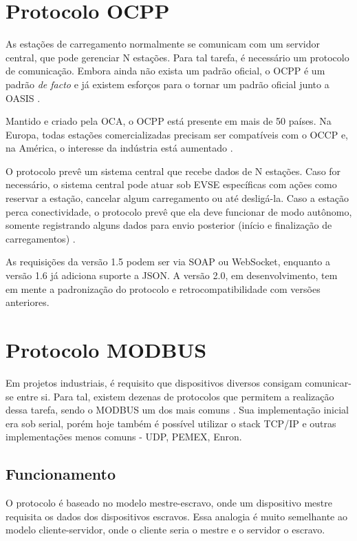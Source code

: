 \section{Protocolo OCPP}

As estações de carregamento normalmente se comunicam com um servidor central, que pode gerenciar N estações. Para tal tarefa, é necessário um protocolo de comunicação. Embora ainda não exista um padrão oficial, o \ac{OCPP} é um padrão \textit{de facto} e já existem esforços para o tornar um padrão oficial junto a \ac{OASIS} \cite{ocpp-news-standardization}.

Mantido e criado pela \ac{OCA}, o OCPP está presente em mais de 50 países. Na Europa, todas estações comercializadas precisam ser compatíveis com o OCCP e, na América, o interesse da indústria está aumentado \cite{ocpp-news-forbes}.

O protocolo prevê um sistema central que recebe dados de N estações. Caso for necessário, o sistema central pode atuar sob \ac{EVSE} específicas com ações como reservar a estação, cancelar algum carregamento ou até desligá-la. Caso a estação perca conectividade, o protocolo prevê que ela deve funcionar de modo autônomo, somente registrando alguns dados para envio posterior (início e finalização de carregamentos) \cite{ocpp-spec-15}.

As requisições da versão 1.5 podem ser via SOAP ou WebSocket, enquanto a versão 1.6 já adiciona suporte a JSON. A versão 2.0, em desenvolvimento, tem em mente a padronização do protocolo e retrocompatibilidade com versões anteriores.

\section{Protocolo MODBUS}

Em projetos industriais, é requisito que dispositivos diversos consigam comunicar-se entre si. Para tal, existem dezenas de protocolos que permitem a realização dessa tarefa, sendo o MODBUS um dos mais comuns \cite{modbus-spec-application}. Sua implementação inicial era sob serial, porém hoje também é possível utilizar o stack TCP/IP e outras implementações menos comuns - UDP, PEMEX, Enron.

\subsection{Funcionamento}

O protocolo é baseado no modelo mestre-escravo, onde um dispositivo mestre requisita os dados dos dispositivos escravos. Essa analogia é muito semelhante ao modelo cliente-servidor, onde o cliente seria o mestre e o servidor o escravo.

